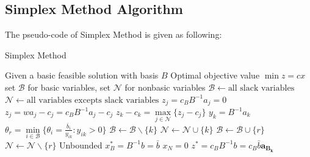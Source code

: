 			\subsection{Simplex Method Algorithm}
				The pseudo-code of Simplex Method is given as following:
				\begin{algorithm}[h!]
					\caption{Simplex Method}
					\begin{algorithmic}[1]
						\REQUIRE Given a basic feasible solution with basis $B$
						\ENSURE Optimal objective value $\min z= cx$
						\STATE set $\mathcal{B}$ for basic variables, set $\mathcal{N}$ for nonbasic variables
						\STATE $\mathcal{B} \gets \text{all slack variables}$
						\STATE $\mathcal{N} \gets \text{all variables excepts slack variables}$
							\STATE $z_j=c_BB^{-1}a_j=0$				
						\ENDFOR
							\STATE $z_j=wa_j-c_j=c_BB^{-1}a_j-c_j$
							\STATE $z_k-c_k=\max\limits_{j \in \mathcal{N}}\{z_j-c_j\}$
							\STATE $y_k=B^{-1}a_k$
								\STATE $\theta_r=\min\limits_{i \in \mathcal{B}}\{\theta_i=\frac{\bar{b}_i}{y_{ik}}:y_{ik}>0\}$
								\STATE $\mathcal{B} \gets \mathcal{B} \backslash \{k\}$
								\STATE $\mathcal{N} \gets \mathcal{N} \cup \{k\}$
								\STATE $\mathcal{B} \gets \mathcal{B} \cup \{r\}$
								\STATE $\mathcal{N} \gets \mathcal{N} \backslash \{r\}$
							\ELSE
								\STATE Unbounded
							\ENDIF
						\ENDWHILE
						\STATE $x_B^*=B^{-1}b=\bar{b}$
						\STATE $x_N=0$
						\STATE $z^*=c_BB^{-1}b=c_B\bar{b}\mathbf{a_{B_k}}$
					\end{algorithmic}
				\end{algorithm}


